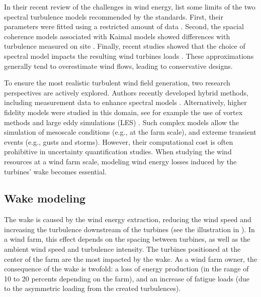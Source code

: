 In their recent review of the challenges in wind energy, \citep{veers_2019_review} list some limits of the two spectral turbulence models recommended by the standards. 
First, their parameters were fitted using a restricted amount of data \citep{dimitrov_2017_turbulence_models_on_loads}. 
Second, the spacial coherence models associated with Kaimal models showed differences with turbulence measured on site \citep{saranyasoontorn_2004}.  
Finally, recent studies showed that the choice of spectral model impacts the resulting wind turbines loads \citep{doubrawa_2019}. 
These approximations generally tend to overestimate wind flows, leading to conservative designs.

To ensure the most realistic turbulent wind field generation, two research perspectives are actively explored. 
Authors recently developed hybrid methods, including measurement data to enhance spectral models \citep{dimitrov_2017_constrained_turbulence}. 
Alternatively, higher fidelity models were studied in this domain, see for example the use of vortex methods \citep{branlard_2017_book} and large eddy simulations (LES) \citep{doubrawa_2019,bui_2022_mesoscale_LES}.  
Such complex models allow the simulation of mesoscale conditions (e.g., at the farm scale), and extreme transient events (e.g., gusts and storms). 
However, their computational cost is often prohibitive in uncertainty quantification studies. 
When studying the wind resources at a wind farm scale, modeling wind energy losses induced by the turbines' wake becomes essential.


\subsection{Wake modeling}

The wake is caused by the wind energy extraction, reducing the wind speed and increasing the turbulence downstream of the turbines (see the illustration in ). 
In a wind farm, this effect depends on the spacing between turbines, as well as the ambient wind speed and turbulence intensity. 
The turbines positioned at the center of the farm are the most impacted by the wake. 
As a wind farm owner, the consequence of the wake is twofold: a loss of energy production (in the range of 10 to 20 percents depending on the farm), and an increase of fatigue loads (due to the asymmetric loading from the created turbulences).

